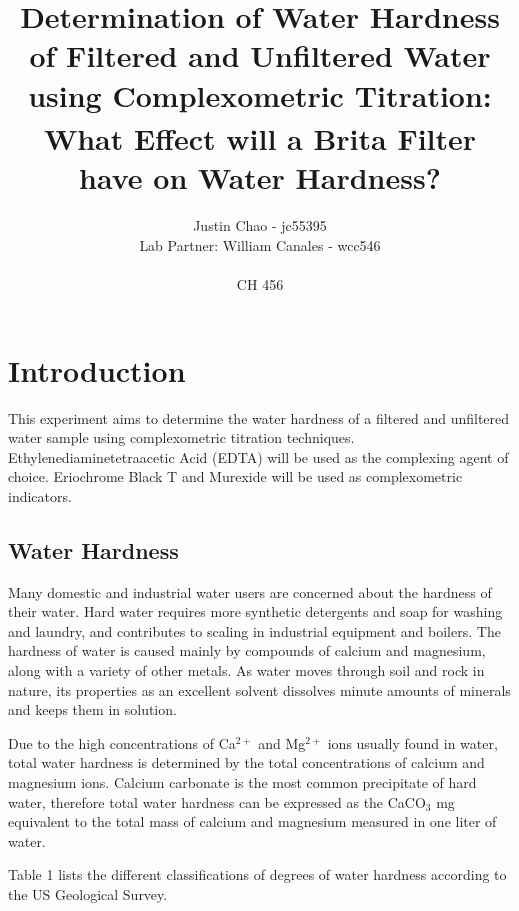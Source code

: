 \documentclass{article}
\begin{document}
 

\title { Determination of Water Hardness of Filtered and
Unfiltered Water using Complexometric Titration: \\ 
What Effect will a Brita\textsuperscript{\textregistered} Filter have on Water Hardness?}
\vspace{20cm} 
\author {Justin Chao - jc55395 
\\ Lab Partner: William Canales - wcc546 
\\ \\ CH 456} 

\maketitle

\newpage

\section {Introduction}
This experiment aims to determine the water hardness of a filtered and unfiltered water sample using
complexometric titration techniques.
Ethylenediaminetetraacetic Acid (EDTA) will be used as the complexing agent of choice.
Eriochrome Black T and Murexide will be used as complexometric indicators.

\subsection {Water Hardness}

Many domestic and industrial water users are concerned about the hardness of
their water. Hard water requires more synthetic detergents and soap for washing
and laundry, and contributes to scaling in industrial equipment and boilers.
The hardness of water is caused mainly by compounds of calcium and magnesium,
along with a variety of other metals. As water moves through soil and rock in
nature, its properties as an excellent solvent dissolves minute amounts of
minerals and keeps them in solution.

Due to the high concentrations of Ca$^{2+}$ and Mg$^{2+}$ ions usually found in
water, total water hardness is determined by the total concentrations of calcium
and magnesium ions. Calcium carbonate is the most common precipitate of hard
water, therefore total water hardness can be expressed as the CaCO$_3$ mg equivalent
to the total mass of calcium and magnesium measured in one liter of water.

Table 1 lists the different classifications of degrees of water hardness
according to the US Geological Survey. \cite{lab_man}
\end{document}
